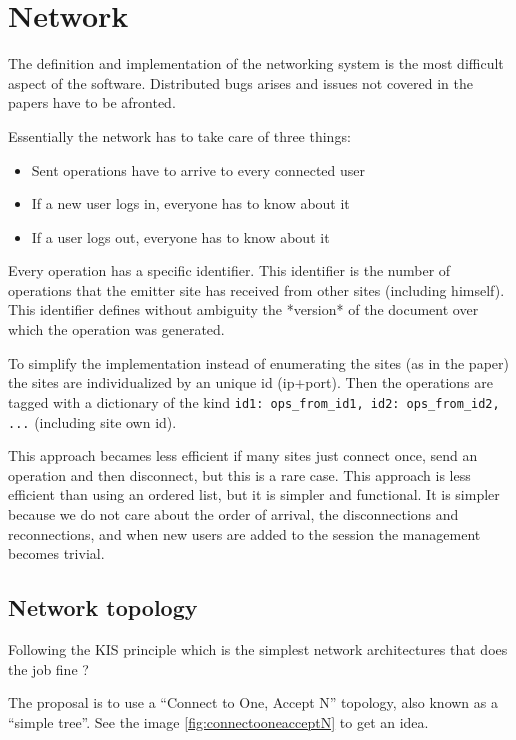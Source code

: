 \documentclass{article}
\begin{document}
\section{Network}

The definition and implementation of the networking system is the most difficult aspect of the software. Distributed bugs arises and issues not covered in the papers have to be afronted.

Essentially the network has to take care of three things:
\begin{itemize}
\item Sent operations have to arrive to every connected user
\item If a new user logs in, everyone has to know about it
\item If a user logs out, everyone has to know about it
\end{itemize}

Every operation has a specific identifier. This identifier is the number of operations that the emitter site has received from other sites (including himself). This identifier defines without ambiguity the *version* of the document over which the operation was generated.

To simplify the implementation instead of enumerating the sites (as in the paper) the sites are individualized by an unique id (ip+port). Then the operations are tagged with a dictionary of the kind {\texttt {id1: ops\_from\_id1, id2: ops\_from\_id2, ...}} (including site own id).

This approach becames less efficient if many sites just connect once, send an operation and then disconnect, but this is a rare case. This approach is less efficient than using an ordered list, but it is simpler and functional. It is simpler because we do not care about the order of arrival, the disconnections and reconnections, and when new users are added to the session the management becomes trivial.

\subsection{Network topology}

Following the KIS principle which is the simplest network architectures that does the job fine ?

The proposal is to use a ``Connect to One, Accept N'' topology, also known as a ``simple tree''. See the image \ref{fig:connectooneacceptN} to get an idea.    
\end{document}
